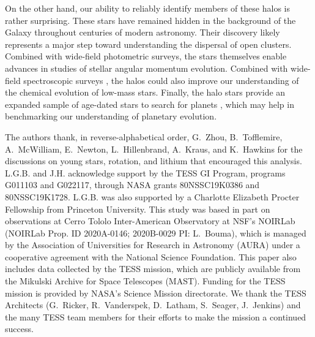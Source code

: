 \documentclass[12pt,twocolumn,tighten]{aastex63}
\begin{document}
On the other hand, our ability to reliably identify members of these
halos is rather surprising.  These stars have remained hidden in the
background of the Galaxy throughout centuries of modern astronomy.
Their discovery likely represents a major step toward understanding
the dispersal of open clusters.
Combined with wide-field photometric surveys, the stars themselves
enable advances in studies of stellar
angular momentum evolution.
Combined with wide-field spectroscopic
surveys \citep[{\it e.g.},][]{kollmeier_2017}, the halos could also
improve our
understanding of the chemical evolution of low-mass stars.
Finally, the halo stars provide an expanded sample of
age-dated stars to search for planets \citep[{\it
e.g.},][]{newton_2021}, which may help in benchmarking our understanding of
planetary evolution.





\acknowledgements
\raggedbottom

The authors thank, in reverse-alphabetical order, G.~Zhou,
B.~Tofflemire, A.~McWilliam, E.~Newton, L.~Hillenbrand, A.~Kraus, and
K.~Hawkins for the discussions on young stars, rotation, and lithium
that encouraged this analysis.
%
L.G.B. and J.H. acknowledge support by the TESS GI Program, programs
G011103 and G022117, through NASA grants 80NSSC19K0386 and
80NSSC19K1728.
%
L.G.B. was also supported by a Charlotte Elizabeth Procter Fellowship
from Princeton University.
%
This study was based in part on observations at Cerro Tololo
Inter-American Observatory at NSF's NOIRLab (NOIRLab Prop{.} ID
2020A-0146; 2020B-0029 PI: L{.}~Bouma), which is managed by the
Association of Universities for Research in Astronomy (AURA) under a
cooperative agreement with the National Science Foundation.
%
%
This paper also includes data collected by the TESS mission, which are
publicly available from the Mikulski Archive for Space Telescopes
(MAST).
%
Funding for the TESS mission is provided by NASA's Science Mission
directorate.
%
We thank the TESS Architects (G.~Ricker, R.~Vanderspek, D.~Latham,
S.~Seager, J.~Jenkins) and the many TESS team members for their
efforts to make the mission a continued success.
%

%
%
\end{document}
